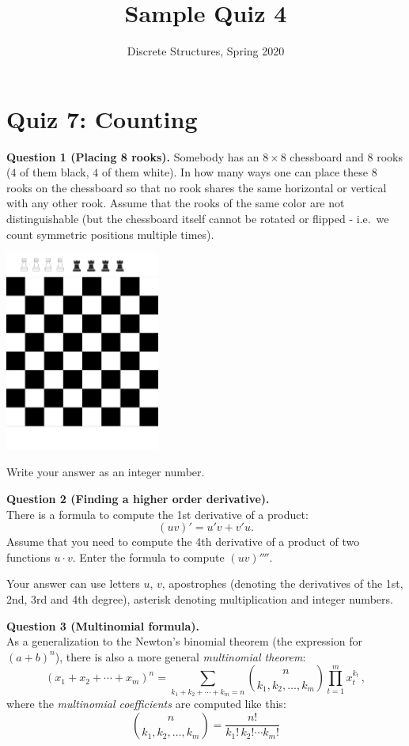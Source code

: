 \documentclass[jou]{apa6}
\title{Sample Quiz 4}
\author{Discrete Structures, Spring 2020}
\affiliation{RBS}
\begin{document}

\twocolumn
\section{Quiz 7: Counting}


\vspace{10pt}
{\bf Question 1 (Placing 8 rooks).} Somebody has an $8 \times 8$ chessboard and 
$8$ rooks ($4$ of them black, $4$ of them white). 
In how many ways one can place these $8$ rooks on the chessboard so that 
no rook shares the same horizontal or vertical with any other rook. 
Assume that the rooks of the same color are not distinguishable (but the chessboard itself cannot be rotated 
or flipped - i.e.\ we count symmetric positions multiple times).
\begin{center}
\includegraphics[width=2in]{quiz7/chessboard.png}
\end{center}

Write your answer as an integer number. 



\vspace{6pt}
{\bf Question 2 (Finding a higher order derivative).}\\
There is a formula to compute the 1st derivative of a product: 
$$(uv)' = u'v + v'u.$$
Assume that you need to compute the 4th derivative of a product of two functions $u\cdot v$. 
Enter the formula to compute $(uv)''''$. 

Your answer can use letters $u$, $v$, 
apostrophes (denoting the derivatives of the 1st, 2nd, 3rd and 4th degree), 
asterisk {\tt *} denoting multiplication and integer numbers. 


\vspace{6pt}
{\bf Question 3 (Multinomial formula).}\\
As a generalization to the Newton's binomial theorem (the expression for $(a+b)^n$), there
is also a more general {\em multinomial theorem}: 
$$(x_1 + x_2  + \cdots + x_m)^n
 = \sum\limits_{k_1+k_2+\cdots+k_m=n} {n \choose k_1, k_2, \ldots, k_m}
  \prod_{t=1}^m x_t^{k_t}\,,$$
where the {\em multinomial coefficients} are computed like this:
$${n \choose k_1, k_2, \ldots, k_m}
 = \frac{n!}{k_1!\, k_2! \cdots k_m!}$$
\end{document}
